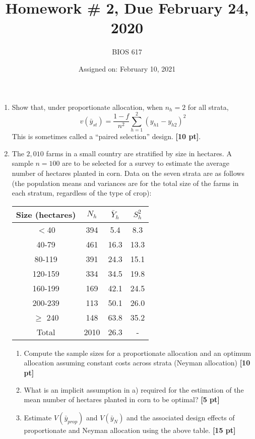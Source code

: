 \documentclass[12pt]{article}
\begin{document}
\title{Homework \# 2, Due February 24, 2020}
\author{BIOS 617}
\date{Assigned on: February 10, 2021}

\maketitle

\begin{enumerate}
\setlength{\itemsep}{15pt}%
\setlength{\parskip}{15pt}%

\item  Show that, under proportionate allocation, when $n_h = 2$ for all strata,
$$
v( \bar y_{st} ) = \frac{1-f}{n^2} \sum_{h=1}^2 ( y_{h1} - y_{h2} )^2
$$
This is sometimes called a ``paired selection'' design.  {\bf [10 pt]}.

\item The $2,010$ farms in a small country are stratified by size in hectares. A sample $n = 100$ are to be selected for a survey to estimate the average number of hectares planted in corn. Data on the seven strata are as follows (the population means and variances are for the total size of the farms in each stratum, regardless of the type of crop):

\begin{table}[!th]
\centering
\begin{tabular}{c c c c}
Size (hectares) & $N_h$ & $\bar Y_h$ & $S_h^2$ \\ \hline
$<$40 & 394 & 5.4 & 8.3 \\
40-79 & 461 & 16.3 & 13.3 \\
80-119 & 391 & 24.3 & 15.1 \\
120-159 & 334 & 34.5 & 19.8 \\
160-199 & 169 & 42.1 & 24.5 \\
200-239 & 113 & 50.1 & 26.0 \\
$\geq$ 240 & 148 & 63.8 & 35.2 \\
Total & 2010 & 26.3 & - \\ \hline
\end{tabular}
\end{table}

	\begin{enumerate}
		\item Compute the sample sizes for a proportionate allocation and an optimum allocation assuming constant costs across strata (Neyman allocation) {\bf [10 pt]}
		\item What is an implicit assumption in a) required for the estimation of the mean number of hectares planted in corn to be optimal? {\bf [5 pt]}
		\item Estimate $V(\bar y_{prop} )$ and $V( \bar y_N )$ and the associated design effects of proportionate and Neyman allocation using the above table. {\bf [15 pt]}
	\end{enumerate}


\end{enumerate}
\end{document}
